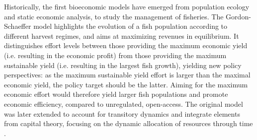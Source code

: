 Historically, the first bioeconomic models have emerged from population ecology and static economic analysis, to study the management of fisheries. The Gordon-Schaeffer \citep{Gordon1954, Schaefer1954} model highlights the evolution of a fish population according to different harvest regimes, and aims at maximizing revenues in equilibrium. It distinguishes effort levels between those providing the maximum economic yield (i.e. resulting in the economic profit) from those providing the maximum sustainable yield (i.e. resulting in the largest fish growth), yielding new policy perspectives: as the maximum sustainable yield effort is larger than the maximal economic yield, the policy target should be the latter. Aiming for the maximum economic effort would therefore yield larger fish populations and promote economic efficiency, compared to unregulated, open-access. The original model was later extended to account for transitory dynamics and integrate elements from capital theory, focusing on the dynamic allocation of resources through time \citep{smith_models_1969, clark_profit_1973}. 

